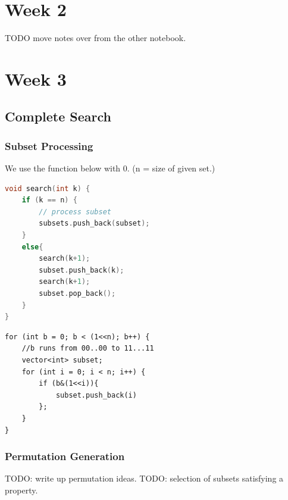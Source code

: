 \documentclass{report}
\begin{document}
\chapter{Week 2}
TODO move notes over from the other notebook.
\chapter{Week 3}
\section{Complete Search}
\subsection*{Subset Processing}
We use the function below with 0. (n = size of given set.)
\begin{lstlisting}[language=C++,caption=Subset Generation]
void search(int k) {
    if (k == n) {
        // process subset
        subsets.push_back(subset);
    }
    else{
        search(k+1);
        subset.push_back(k);
        search(k+1);
        subset.pop_back();
    }
}
\end{lstlisting}
\begin{lstlisting}
for (int b = 0; b < (1<<n); b++) {
    //b runs from 00..00 to 11...11
    vector<int> subset;
    for (int i = 0; i < n; i++) {
        if (b&(1<<i)){
            subset.push_back(i)
        };
    }
}
\end{lstlisting}
\subsection*{Permutation Generation}
TODO: write up permutation ideas.
TODO: selection of subsets satisfying a property.
\end{document}
